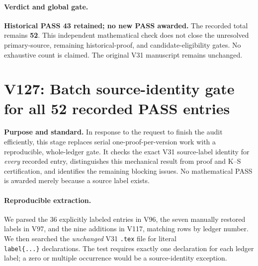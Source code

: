 \documentclass[11pt]{article}
\begin{document}
\paragraph{Verdict and global gate.} \textbf{Historical PASS 43 retained; no new PASS awarded.} The recorded total remains \textbf{52}. This independent mathematical check does not close the unresolved primary-source, remaining historical-proof, and candidate-eligibility gates. No exhaustive count is claimed. The original V31 manuscript remains unchanged.

\clearpage
\section{V127: Batch source-identity gate for all 52 recorded PASS entries}
\noindent\textbf{Purpose and standard.} In response to the request to finish the audit efficiently, this stage replaces serial one-proof-per-version work with a reproducible, whole-ledger gate. It checks the exact V31 source-label identity for \emph{every} recorded entry, distinguishes this mechanical result from proof and K--S certification, and identifies the remaining blocking issues. No mathematical PASS is awarded merely because a source label exists.

\paragraph{Reproducible extraction.} We parsed the 36 explicitly labeled entries in V96, the seven manually restored labels in V97, and the nine additions in V117, matching rows by ledger number. We then searched the \emph{unchanged} V31 \texttt{.tex} file for literal \texttt{\\label\{...\}} declarations. The test requires exactly one declaration for each ledger label; a zero or multiple occurrence would be a source-identity exception.
\end{document}
